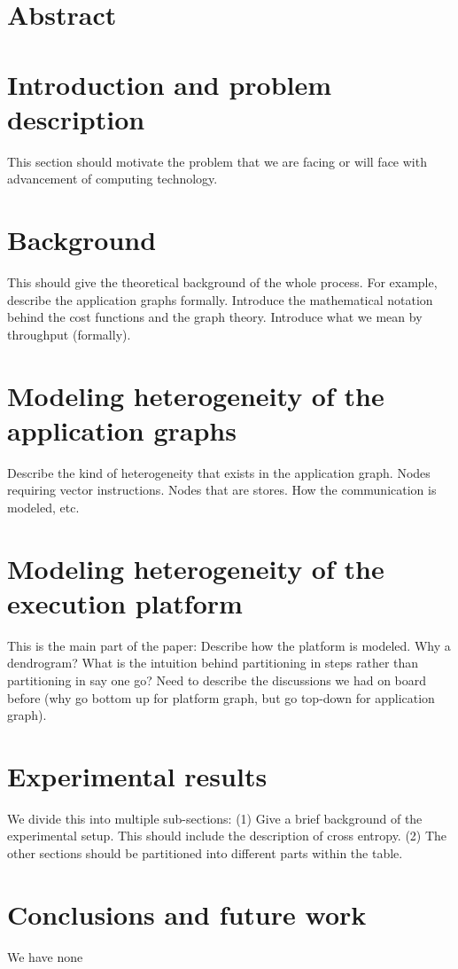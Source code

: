 \documentclass[10pt]{article}
\begin{document}
\section{Abstract}
\label{sec:abstract-2}

\section{Introduction and problem description}
\label{sec:intr-probl-descr}

This section should motivate the problem that we are facing or will face
with advancement of computing technology.

\section{Background}
\label{sec:background}

This should give the theoretical background of the whole process. For
example, describe the application graphs formally. Introduce the
mathematical notation behind the cost functions and the graph
theory. Introduce what we mean by throughput (formally).

\section{Modeling heterogeneity of the application graphs}
\label{sec:model-heter-appl}

Describe the kind of heterogeneity that exists in the application
graph. Nodes requiring vector instructions. Nodes that are stores. How
the communication is modeled, etc.

\section{Modeling heterogeneity of the execution platform}
\label{sec:model-heter-exec}

This is the main part of the paper: Describe how the platform is
modeled. Why a dendrogram? What is the intuition behind partitioning in
steps rather than partitioning in say one go? Need to describe the
discussions we had on board before (why go bottom up for platform graph,
but go top-down for application graph).

\section{Experimental results}
\label{sec:experimental-results}

We divide this into multiple sub-sections: (1) Give a brief background
of the experimental setup. This should include the description of cross
entropy. (2) The other sections should be partitioned into different
parts within the table.


\section{Conclusions and future work}
\label{sec:concl-future-work}

We have none
\end{document}
